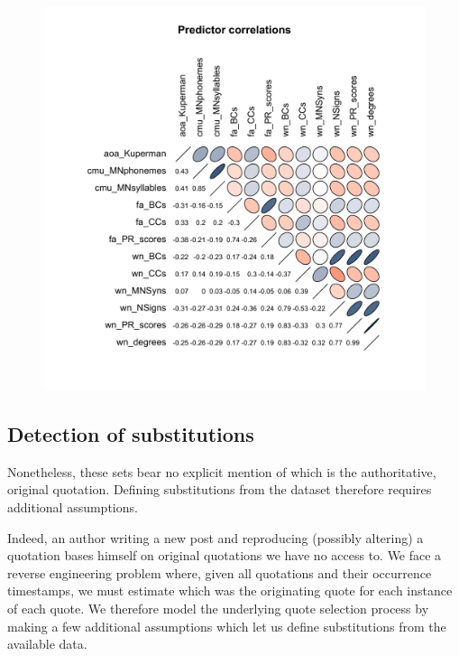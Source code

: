 \begin{figure}[!th]
    \includegraphics[width=\linewidth]{algorithms/Rplot.pdf}
\end{figure}

\subsection{Detection of substitutions}

Nonetheless, these sets bear no explicit mention of which is the authoritative, original quotation.  Defining substitutions from the dataset therefore requires additional assumptions.  

Indeed, an author writing a new post and reproducing (possibly altering) a quotation bases himself on original quotations we have no access to. We face a reverse engineering problem where, given all quotations and their occurrence timestamps, we must estimate which was the originating quote for each instance of each quote. We therefore model the underlying quote selection process by making a few additional assumptions which let us define substitutions from the available data.

